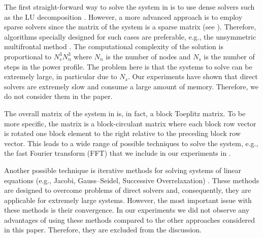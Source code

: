 The first straight-forward way to solve the system in  is to use dense solvers such as the LU decomposition \cite{press2007}. However, a more advanced approach is to employ sparse solvers since the matrix of the system is a sparse matrix (see ). Therefore, algorithms specially designed for such cases are preferable, e.g., the unsymmetric multifrontal method \cite{umfpack2004}. The computational complexity of the solution is proportional to $N_s^3 N_n^3$ \cite{press2007} where $N_n$ is the number of nodes and $N_s$ is the number of steps in the power profile. The problem here is that the systems to solve can be extremely large, in particular due to $N_s$. Our experiments have shown that direct solvers are extremely slow and consume a large amount of memory. Therefore, we do not consider them in the paper.

The overall matrix of the system in  is, in fact, a block Toeplitz matrix. To be more specific, the matrix is a block-circulant matrix where each block row vector is rotated one block element to the right relative to the preceding block row vector. This leads to a wide range of possible techniques to solve the system, e.g., the fast Fourier transform (FFT) \cite{mazancourt1983} that we include in our experiments in .

Another possible technique is iterative methods for solving systems of linear equations (e.g., Jacobi, Gauss--Seidel, Successive Overrelaxation) \cite{press2007}. These methods are designed to overcome problems of direct solvers and, consequently, they are applicable for extremely large systems. However, the most important issue with these methods is their convergence. In our experiments we did not observe any advantages of using these methods compared to the other approaches considered in this paper. Therefore, they are excluded from the discussion.
